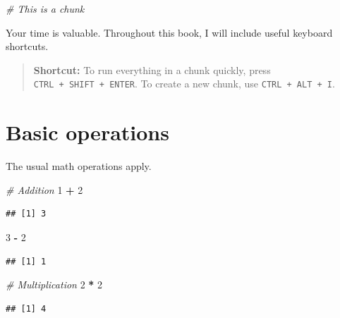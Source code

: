 \documentclass[openany]{book}
\newenvironment{Shaded}{\begin{snugshade}}{\end{snugshade}}
\newcommand{\CommentTok}[1]{\textcolor[rgb]{0.56,0.35,0.01}{\textit{#1}}}
\newcommand{\DecValTok}[1]{\textcolor[rgb]{0.00,0.00,0.81}{#1}}
\newcommand{\OperatorTok}[1]{\textcolor[rgb]{0.81,0.36,0.00}{\textbf{#1}}}
\newcommand{\StringTok}[1]{\textcolor[rgb]{0.31,0.60,0.02}{#1}}
\begin{document}
\begin{Shaded}
\begin{Highlighting}[]
\CommentTok{# This is a chunk}
\end{Highlighting}
\end{Shaded}

Your time is valuable. Throughout this book, I will include useful keyboard shortcuts.

\begin{quote}
\textbf{Shortcut:} To run everything in a chunk quickly, press \texttt{CTRL\ +\ SHIFT\ +\ ENTER}.
To create a new chunk, use \texttt{CTRL\ +\ ALT\ +\ I}.
\end{quote}

\hypertarget{basic-operations}{%
\section{Basic operations}\label{basic-operations}}

The usual math operations apply.

\begin{Shaded}
\begin{Highlighting}[]
\CommentTok{# Addition}
\DecValTok{1} \OperatorTok{+}\StringTok{ }\DecValTok{2} 
\end{Highlighting}
\end{Shaded}

\begin{verbatim}
## [1] 3
\end{verbatim}

\begin{Shaded}
\begin{Highlighting}[]
\DecValTok{3} \OperatorTok{-}\StringTok{ }\DecValTok{2}
\end{Highlighting}
\end{Shaded}

\begin{verbatim}
## [1] 1
\end{verbatim}

\begin{Shaded}
\begin{Highlighting}[]
\CommentTok{# Multiplication}
\DecValTok{2} \OperatorTok{*}\StringTok{ }\DecValTok{2}
\end{Highlighting}
\end{Shaded}

\begin{verbatim}
## [1] 4
\end{verbatim}
\end{document}

